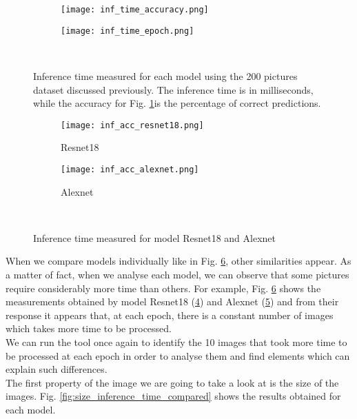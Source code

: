 \begin{figure}[h]
     \begin{subfigure}{0.5\textwidth}
	    \texttt{[image: inf\_time\_accuracy.png]}
	    \caption{}
         \label{fig:inf_time_accuracy}
     \end{subfigure}
     \hfill
     \begin{subfigure}{0.5\textwidth}
	    \texttt{[image: inf\_time\_epoch.png]}
	    \caption{}
        \label{fig:inf_time_epoch}
     \end{subfigure}\\
     \caption[Inference time measured for each model]{Inference time measured for each model using the 200 pictures dataset discussed previously. The inference time is in milliseconds, while the accuracy for Fig. \ref{fig:inf_time_accuracy}is the percentage of correct predictions.}
        \label{fig:inf_time_epoch_c}
\end{figure}

\begin{figure}[h]
     \begin{subfigure}{0.5\textwidth}
	    \texttt{[image: inf\_acc\_resnet18.png]}
	    \caption{Resnet18}
         \label{fig:inf_acc_resnet18}
         
     \end{subfigure}
     \hfill
     \begin{subfigure}{0.5\textwidth}
	    \texttt{[image: inf\_acc\_alexnet.png]}
	    \caption{Alexnet}
        \label{fig:inf_acc_alexnet}
        
     \end{subfigure}\\
     \caption{Inference time measured for model Resnet18 and Alexnet}
        \label{fig:inf_acc_c}
\end{figure}
When we compare models individually like in Fig. \ref{fig:inf_acc_c}, other similarities appear. As a matter of fact, when we analyse each model, we can observe that some pictures require considerably more time than others. For example, Fig. \ref{fig:inf_acc_c} shows the measurements obtained by model Resnet18 (\ref{fig:inf_acc_resnet18}) and Alexnet (\ref{fig:inf_acc_alexnet}) and from their response it appears that, at each epoch, there is a constant number of images which takes more time to be processed. \\
We can run the tool once again to identify the 10 images that took more time to be processed at each epoch in order to analyse them and find elements which can explain such differences. \\
The first property of the image we are going to take a look at is the size of the images. Fig. \ref{fig:size_inference_time_compared} shows the results obtained for each model. 


